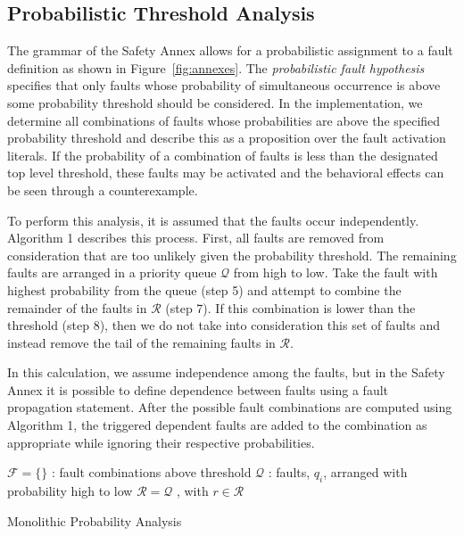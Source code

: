 \subsection{Probabilistic Threshold Analysis}
The grammar of the Safety Annex allows for a probabilistic assignment to a fault definition as shown in Figure~\ref{fig:annexes}. The \textit{probabilistic fault hypothesis} specifies that only faults whose probability of simultaneous occurrence is above some probability threshold should be considered. In the implementation, we determine all combinations of faults whose probabilities are above the specified probability threshold and describe this as a proposition over the fault activation literals. If the probability of a combination of faults is less than the designated top level threshold, these faults may be activated and the behavioral effects can be seen through a counterexample.  

To perform this analysis, it is assumed that the faults occur independently. Algorithm 1 describes this process. First, all faults are removed from consideration that are too unlikely given the probability threshold. The remaining faults are arranged in a priority queue $\mathcal{Q}$ from high to low. Take the fault with highest probability from the queue (step 5) and attempt to combine the remainder of the faults in $\mathcal{R}$ (step 7). If this combination is lower than the threshold (step 8), then we do not take into consideration this set of faults and instead remove the tail of the remaining faults in $\mathcal{R}$. %
 
In this calculation, we assume independence among the faults, but in the Safety Annex it is possible to define dependence between faults using a fault propagation statement. After the possible fault combinations are computed using Algorithm 1, the triggered dependent faults are added to the combination as appropriate while ignoring their respective probabilities.

\begin{algorithm}[H]
	$\mathcal{F} = \{\}$ : fault combinations above threshold \;
	$\mathcal{Q}$ : faults, $q_i$, arranged with probability high to low \;
	$\mathcal{R} = \mathcal{Q}$ , with $r \in \mathcal{R}$\;
	\caption{Monolithic Probability Analysis}
\end{algorithm}

